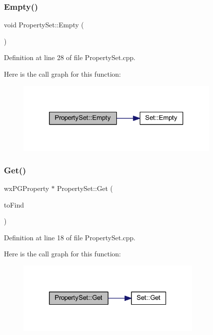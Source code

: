 \subsubsection{\texorpdfstring{Empty()}{Empty()}}
{\footnotesize\ttfamily void Property\+Set\+::\+Empty (\begin{DoxyParamCaption}{ }\end{DoxyParamCaption})}



Definition at line 28 of file Property\+Set.\+cpp.

Here is the call graph for this function\+:\nopagebreak
\begin{figure}[H]
\begin{center}
\leavevmode
\includegraphics[width=285pt]{class_property_set_a158da716546ca640cd81ffb555bcfddc_cgraph}
\end{center}
\end{figure}
\mbox{\label{class_property_set_abfdeede5db336610ec5936a57ec3c2fe}} 
\subsubsection{\texorpdfstring{Get()}{Get()}}
{\footnotesize\ttfamily wx\+P\+G\+Property $\ast$ Property\+Set\+::\+Get (\begin{DoxyParamCaption}\item[{wx\+P\+G\+Property $\ast$}]{to\+Find }\end{DoxyParamCaption})}



Definition at line 18 of file Property\+Set.\+cpp.

Here is the call graph for this function\+:\nopagebreak
\begin{figure}[H]
\begin{center}
\leavevmode
\includegraphics[width=259pt]{class_property_set_abfdeede5db336610ec5936a57ec3c2fe_cgraph}
\end{center}
\end{figure}
\mbox{\label{class_property_set_aece224749884f449d1afda598d468b41}} 
